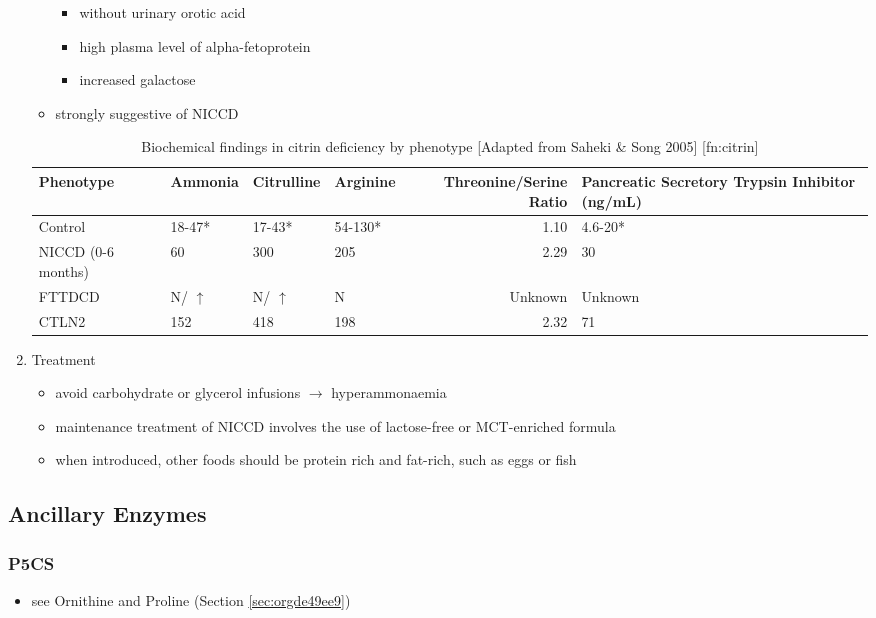 \documentclass[12pt]{scrartcl}
\begin{document}
\begin{center}
\begin{center}
\begin{enumerate}
\begin{itemize}
\begin{itemize}
\item without urinary orotic acid
\item high plasma level of alpha-fetoprotein
\item \textpm{} increased galactose
\end{itemize}
\item strongly suggestive of  NICCD
\end{itemize}



\begin{table}[htbp]
\caption{\label{tab:orgb9f5ddd}Biochemical findings in citrin deficiency by phenotype [Adapted from Saheki \& Song 2005] [fn:citrin]}
\centering
\begin{tabular}{llllrl}
Phenotype & Ammonia & Citrulline & Arginine & Threonine/Serine Ratio & Pancreatic Secretory Trypsin Inhibitor (ng/mL)\\
\hline
Control & 18-47* & 17-43* & 54-130* & 1.10 & 4.6-20*\\
NICCD (0-6 months) & 60 & 300 & 205 & 2.29 & 30\\
FTTDCD & N/ \(\uparrow\) & N/ \(\uparrow\) & N & Unknown & Unknown\\
CTLN2 & 152 & 418 & 198 & 2.32 & 71\\
\end{tabular}
\end{table}

\item Treatment
\label{sec:org6e7f514}
\begin{itemize}
\item avoid carbohydrate or glycerol infusions \(\to\) hyperammonaemia
\item maintenance treatment of NICCD involves the use of lactose-free or
MCT-enriched formula
\item when introduced, other foods should be protein rich and fat-rich,
such as eggs or fish
\end{itemize}
\end{enumerate}
\subsection{Ancillary Enzymes}
\label{sec:org3fe58f5}
\subsubsection{P5CS}
\label{sec:org9c13c29}
\begin{itemize}
\item see Ornithine and Proline (Section \ref{sec:orgde49ee9})
\end{itemize}

\end{center}
\end{center}
\end{document}
